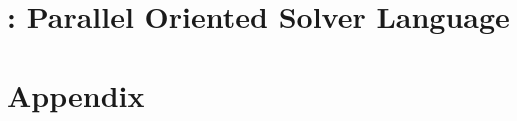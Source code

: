 \documentclass[a4paper,11pt,twoside,parskip=half,numbers=noenddot,bibliography=totocnumbered,listof = totoc]{scrbook}
\begin{document}

\frontmatter
%

\cleardoublepage
%

\cleardoublepage
\dominitoc
\tableofcontents
%
%
%

\mainmatter

%
%
%
\part{\posl{}: Parallel Oriented Solver Language}

%
%

%

\footnotesize
{} %

\normalsize

%

\part{Appendix}
%
%
%
%

%
\end{document}
